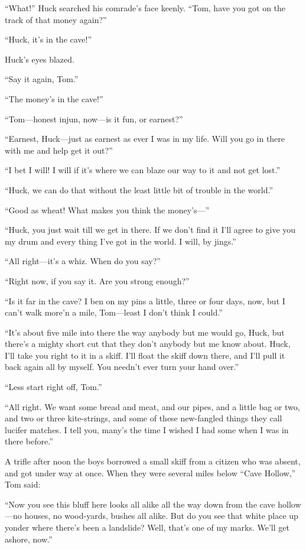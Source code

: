 \documentclass{book}
\begin{document}
“What!” Huck searched his comrade’s face keenly. “Tom, have you got on the track of that money again?”

“Huck, it’s in the cave!”

Huck’s eyes blazed.

“Say it again, Tom.”

“The money’s in the cave!”

“Tom—honest injun, now—is it fun, or earnest?”

“Earnest, Huck—just as earnest as ever I was in my life. Will you go in there with me and help get it out?”

“I bet I will! I will if it’s where we can blaze our way to it and not get lost.”

“Huck, we can do that without the least little bit of trouble in the world.”

“Good as wheat! What makes you think the money’s—”

“Huck, you just wait till we get in there. If we don’t find it I’ll agree to give you my drum and every thing I’ve got in the world. I will, by jings.”

“All right—it’s a whiz. When do you say?”

“Right now, if you say it. Are you strong enough?”

“Is it far in the cave? I ben on my pins a little, three or four days, now, but I can’t walk more’n a mile, Tom—least I don’t think I could.”

“It’s about five mile into there the way anybody but me would go, Huck, but there’s a mighty short cut that they don’t anybody but me know about. Huck, I’ll take you right to it in a skiff. I’ll float the skiff down there, and I’ll pull it back again all by myself. You needn’t ever turn your hand over.”

“Less start right off, Tom.”

“All right. We want some bread and meat, and our pipes, and a little bag or two, and two or three kite-strings, and some of these new-fangled things they call lucifer matches. I tell you, many’s the time I wished I had some when I was in there before.”

A trifle after noon the boys borrowed a small skiff from a citizen who was absent, and got under way at once. When they were several miles below “Cave Hollow,” Tom said:

“Now you see this bluff here looks all alike all the way down from the cave hollow—no houses, no wood-yards, bushes all alike. But do you see that white place up yonder where there’s been a landslide? Well, that’s one of my marks. We’ll get ashore, now.”
\end{document}
